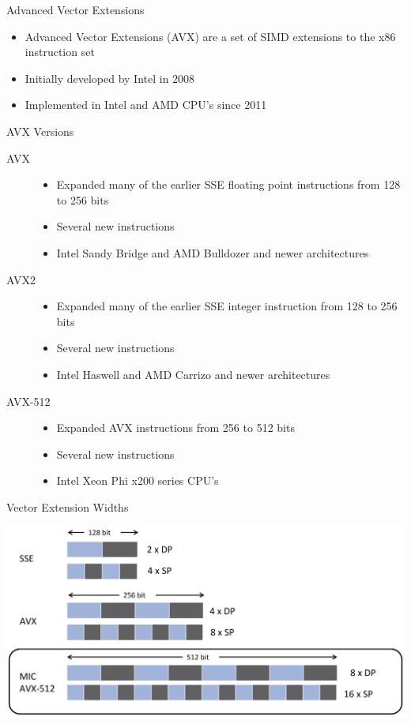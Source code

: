 \begin{frame}{Advanced Vector Extensions}
\begin{itemize}
    \item Advanced Vector Extensions (AVX) are a set of SIMD extensions to the x86 instruction set
    \item Initially developed by Intel in 2008
    \item Implemented in Intel and AMD CPU's since 2011
\end{itemize}
\end{frame}

\begin{frame}{AVX Versions}
\begin{description}
   \item[AVX]
    \begin{itemize}
        \item Expanded many of the earlier SSE floating point instructions from 128 to 256 bits
        \item Several new instructions
        \item Intel Sandy Bridge and AMD Bulldozer and newer architectures
    \end{itemize}
   \item[AVX2]
    \begin{itemize}
        \item Expanded many of the earlier SSE integer instruction from 128 to 256 bits
        \item Several new instructions
        \item Intel Haswell and AMD Carrizo and newer architectures
    \end{itemize}
   \item[AVX-512]
    \begin{itemize}
        \item Expanded AVX instructions from 256 to 512 bits
        \item Several new instructions
        \item Intel Xeon Phi x200 series CPU's
    \end{itemize}
\end{description}
\end{frame}

\begin{frame}{Vector Extension Widths}
\begin{center}
\includegraphics[width=\textwidth]{figures/vector_widths_1.pdf}
\end{center}
\end{frame}

